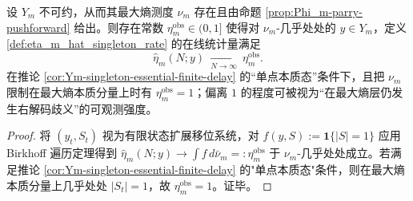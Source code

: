 \begin{proposition}\label{prop:eta_m_hat_ergodic_limit}
设 \(Y_m\) 不可约，从而其最大熵测度 \(\nu_m\) 存在且由命题 \ref{prop:Phi_m-parry-pushforward} 给出。则存在常数 \(\eta_m^{\mathrm{obs}}\in(0,1]\) 使得对 \(\nu_m\)-几乎处处的 \(y\in Y_m\)，定义 \ref{def:eta_m_hat_singleton_rate} 的在线统计量满足
\[
\widehat\eta_m(N;y)\ \xrightarrow[N\to\infty]{}\ \eta_m^{\mathrm{obs}}.
\]
在推论 \ref{cor:Ym-singleton-essential-finite-delay} 的“单点本质态”条件下，且把 \(\nu_m\) 限制在最大熵本质分量上时有 \(\eta_m^{\mathrm{obs}}=1\)；偏离 \(1\) 的程度可被视为“在最大熵层仍发生右解码歧义”的可观测强度。
\end{proposition}
\begin{proof}
将 \((y_t,S_t)\) 视为有限状态扩展移位系统，对 \(f(y,S):=\mathbf{1}\{|S|=1\}\) 应用 Birkhoff 遍历定理得到
\(
\widehat\eta_m(N;y)\to \int f\,d\bar\nu_m=:\eta_m^{\mathrm{obs}}
\)
于 \(\nu_m\)-几乎处处成立。若满足推论 \ref{cor:Ym-singleton-essential-finite-delay} 的"单点本质态"条件，则在最大熵本质分量上几乎处处 \(|S_t|=1\)，故 \(\eta_m^{\mathrm{obs}}=1\)。证毕。
\end{proof}
